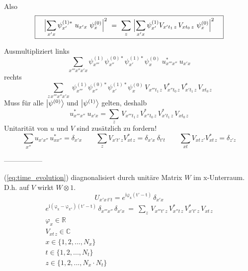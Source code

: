 \documentclass[12pt]{article}
\begin{document}
Also 
\begin{equation} 
\boxed{
\quad\Bigl| \sum_{x'x} \psi^{(1)*}_{x'}\ u_{x'x}\ \psi^{(0)}_x \Bigr|^2 
\ =\ \sum_{z}\ \Bigl|\sum_{x'x} \psi^{(1)}_{x'} V_{x't_1\, z}\, V_{xt_0\, z}\ \psi^{(0)}_{x} \Bigr|^2 \quad
}
\end{equation}

Ausmultipliziert links
\begin{equation} 
\sum_{x'''x''x'x}\psi^{(1)}_{x'''}\psi^{(0)*}_{x''}\psi^{(1)*}_{x'}\psi^{(0)}_x
\ u^*_{x'''x''}\ u_{x'x}
\end{equation}
rechts
\begin{equation} 
\sum_{z\,x'''x''x'x}\ 
\psi^{(1)}_{x'''}\psi^{(0)*}_{x''}\psi^{(1)*}_{x'}\psi^{(0)}_{x}
\, V_{x'''t_1\, z}\, V^*_{x''t_0\, z}\, V^*_{x't_1\, z}\, V_{xt_0\, z}
\end{equation}
Muss für alle $\ket{\psi^{(0)}}$ und $\ket{\psi^{(1)}}$ gelten, deshalb
\begin{equation} 
\boxed{
u^*_{x'''x''}\ u_{x'x} = \sum_z \, V_{x'''t_1\, z}\, V^*_{x''t_0\, z}\, V^*_{x't_1\, z}\, V_{xt_0\, z} 
}
\end{equation}
Unitarität von $u$ und $V$ sind zusätzlich zu fordern!
\begin{equation} 
\sum_{x''} u_{x'x''}\, u^*_{xx''} = \delta_{x'x} \quad\quad 
\sum_{z} V_{x't'\, z} V^*_{xt\, z} = \delta_{x'x}\ \delta_{t't} \quad\quad
\sum_{xt} V_{xt\, z'} V^*_{xt\, z} = \delta_{z'z}
\end{equation}

-----------------

(\ref{eq:time_evolution}) diagnonalisiert durch unitäre Matrix $W$ im x-Unterraum. D.h. auf $V$ wirkt $W \otimes \mathrm{1}$.
\begin{equation}
U_{x'x\,t't} = e^\mathrm{i\varphi_x(t'-t)}\,\delta_{x'x}
\end{equation}
\begin{equation}
\begin{split}
\boxed{
e^\mathrm{i(\varphi_x-\varphi_{x''})(t'-t)}\,\delta_{x'''x''}\,\delta_{x'x}\ =\ \sum_z \, V_{x'''t'\, z}\, V^*_{x''t\, z}\, V^*_{x't'\, z}\, V_{xt\, z} 
} \\
\varphi_x \in \mathbb{R} \\ V_{xt\, z} \in \mathbb{C} \\
x \in \{1,2,...,N_x\}\\ t \in \{1,2,...,N_t\}\\ z \in \{1,2,...,N_x \cdot N_t\} 
\end{split}
\end{equation}
\end{document}
